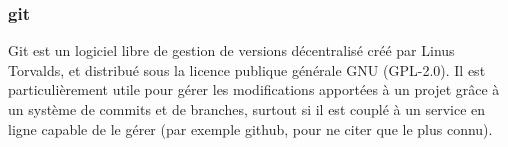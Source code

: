 	\subsubsection{git}
	Git est un logiciel libre de gestion de versions décentralisé créé par Linus Torvalds, et distribué sous la licence publique générale GNU (GPL-2.0). Il est particulièrement utile pour gérer les modifications apportées à un projet grâce à un système de commits et de branches, surtout si il est couplé à un service en ligne capable de le gérer (par exemple github, pour ne citer que le plus connu).
